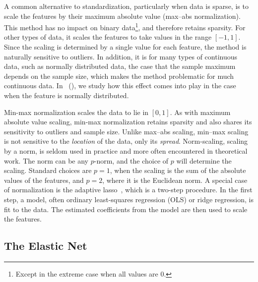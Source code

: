 A common alternative to standardization, particularly when data is sparse, is to scale the features by their maximum absolute value (max--abs normalization). This method has no impact on binary data\footnote{Except in the extreme case when all values are 0.}, and therefore retains sparsity. For other types of data, it scales the features to take values in the range \([-1, 1]\). Since the scaling is determined by a single value for each feature, the method is naturally sensitive to outliers. In addition, it is for many types of continuous data, such as normally distributed data, the case that the sample maximum depends on the sample size, which makes the method problematic for much continuous data. In ~(), we study how this effect comes into play in the case when the feature is normally distributed.

Min-max normalization scales the data to lie in \([0, 1]\). As with maximum absolute value scaling, min-max normalization retains sparsity and also shares its sensitivity to outliers and sample size. Unlike max--abs scaling, min--max scaling is not sensitive to the \emph{location} of the data, only its \emph{spread}.
Norm-scaling, scaling by a norm, is seldom used in practice and more often encountered in theoretical work. The norm can be any \(p\)-norm, and the choice of \(p\) will determine the scaling. Standard choices are \(p=1\), when the scaling is the sum of the absolute values of the features, and \(p=2\), where it is the Euclidean norm.
A special case of normalization is the adaptive lasso~\citep{zou2006}, which is a two-step procedure. In the first step, a model, often ordinary least-squares regression (OLS) or ridge regression, is fit to the data. The estimated coefficients from the model are then used to scale the features.

\subsection{The Elastic Net}

